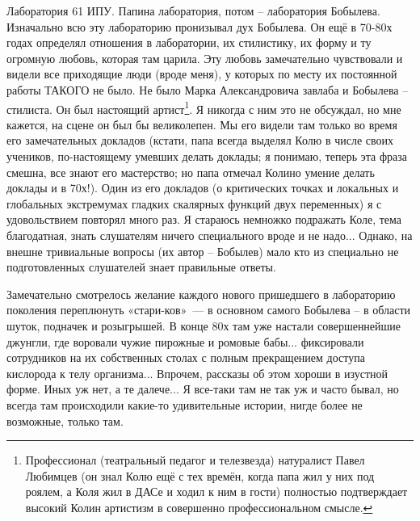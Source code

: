Лаборатория 61 ИПУ. Папина лаборатория, потом – лаборатория Бобылева. Изначально всю эту лабораторию пронизывал дух Бобылева. Он ещё в 70-80х годах определял отношения в лаборатории, их стилистику, их форму и ту огромную любовь, которая там царила. Эту любовь замечательно чувствовали и видели все приходящие люди (вроде меня), у которых по месту их постоянной работы ТАКОГО не было. Не было Марка Александровича завлаба и Бобылева – стилиста. Он был настоящий артист\footnote{Профессионал (театральный педагог и телезвезда) натуралист Павел Любимцев (он знал Колю ещё с тех времён, когда папа жил у них под роялем, а Коля жил в ДАСе и ходил к ним в гости) полностью подтверждает высокий Колин артистизм в совершенно профессиональном смысле.}. Я никогда с ним это не обсуждал, но мне кажется, на сцене он был бы великолепен. Мы его видели там только во время его замечательных докладов (кстати, папа всегда выделял Колю в числе своих учеников, по-настоящему умевших делать доклады; я понимаю, теперь эта фраза смешна, все знают его мастерство; но папа отмечал Колино умение делать доклады и в 70х!). Один из его докладов (о критических точках и локальных и глобальных экстремумах гладких скалярных функций двух переменных) я с удовольствием повторял много раз.  Я стараюсь немножко подражать Коле, тема благодатная, знать слушателям ничего специального вроде и не надо... Однако, на внешне тривиальные вопросы (их автор – Бобылев) мало кто из специально не подготовленных слушателей знает правильные ответы.

Замечательно смотрелось желание каждого нового пришедшего в лабораторию поколения переплюнуть
«стари-\linebreak ков»~---
в основном самого Бобылева – в области шуток, подначек и розыгрышей.
В конце 80х там уже настали совершеннейшие джунгли, где воровали чужие пирожные и ромовые бабы...
фиксировали сотрудников на их собственных столах с полным прекращением доступа кислорода к телу организма...
Впрочем, рассказы об этом хороши в изустной форме. Иных уж нет, а те далече...
Я все-таки там не так уж и часто бывал, но всегда там происходили какие-то удивительные истории,
нигде более не возможные, только там.

